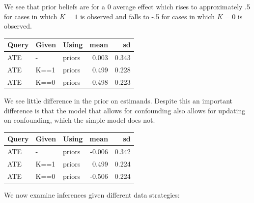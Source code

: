 \documentclass[
  12pt,
]{book}
\begin{document}
We see that prior beliefs are for a 0 average effect which rises to approximately .5 for cases in which \(K=1\) is observed and falls to -.5 for cases in which \(K=0\) is observed.

\begin{tabular}{l|l|l|r|r}
\hline
Query & Given & Using & mean & sd\\
\hline
ATE & - & priors & 0.003 & 0.343\\
\hline
ATE & K==1 & priors & 0.499 & 0.228\\
\hline
ATE & K==0 & priors & -0.498 & 0.223\\
\hline
\end{tabular}

We see little difference in the prior on estimands. Despite this an important difference is that the model that allows for confounding also allows for updating on confounding, which the simple model does not.

\begin{tabular}{l|l|l|r|r}
\hline
Query & Given & Using & mean & sd\\
\hline
ATE & - & priors & -0.006 & 0.342\\
\hline
ATE & K==1 & priors & 0.499 & 0.224\\
\hline
ATE & K==0 & priors & -0.506 & 0.224\\
\hline
\end{tabular}

We now examine inferences given different data strategies:
\end{document}

